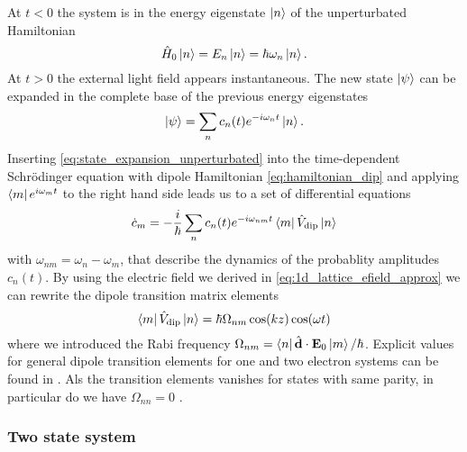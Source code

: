 At $t<0$ the system is in the energy eigenstate $\ket{n}$ of the unperturbated
Hamiltonian
\begin{equation}
  \hat{H}_0\ket{n}
  =E_n\ket{n}
  =\hbar\omega_n\ket{n}
  \label{eq:eigenvalue_energy_unperturbated}.
\end{equation}
At $t>0$ the external light field appears instantaneous. The new state
$\ket{\psi}$ can be expanded in the complete base of the previous energy
eigenstates
\begin{equation}
  \ket{\psi}
  =\sum_nc_n(t)e^{-i\omega_nt}\ket{n}
  \label{eq:state_expansion_unperturbated}.
\end{equation}
Inserting \cref{eq:state_expansion_unperturbated} into the time-dependent
Schrödinger equation with dipole Hamiltonian \cref{eq:hamiltonian_dip} and
applying $\bra{m}e^{i\omega_mt}$ to the right hand side leads us to a set
of differential equations
\begin{equation}
  \dot{c}_m
  =-\frac{i}{\hbar}\sum_nc_n(t)e^{-i\omega_{nm}t}\bra{m}\hat{V}_\text{dip}\ket{n}
  \label{eq:differential_equation_population_dynamics}
\end{equation}
with $\omega_{nm}=\omega_n-\omega_m$, that describe the dynamics of the
probablity amplitudes $c_n(t)$. By using the electric field we derived in
\cref{eq:1d_lattice_efield_approx} we can rewrite the dipole transition
matrix elements
\begin{equation}
  \bra{m}\hat{V}_\text{dip}\ket{n}
  =\hbar\Omega_{nm}\cos(kz)\cos(\omega t)
  \label{eq:elements_dipole_transition_matrix}
\end{equation}
where we introduced the Rabi frequency
$\Omega_{nm}=\bra{n}\hat{\vb{d}}\cdot\vb{E}_0\ket{m}/\hbar$. Explicit values
for general dipole transition elements for one and two electron systems can
be found in \cite{Bethe1957}. Als the transition elements vanishes for states
with same parity, in particular do we have $\Omega_{nn}=0$
\cite{Bartelmann2018}.

\subsubsection{Two state system}

